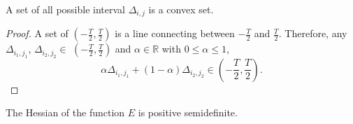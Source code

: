 \begin{prop}
A set of all possible interval $\Delta_{i,j}$ is a convex set.
\label{prop:convexset}
\end{prop}
\begin{proof}
A set of $(-\frac{T}{2}, \frac{T}{2})$ is a line connecting between $-\frac{T}{2}$ and $\frac{T}{2}$. 
Therefore, any $\Delta_{i_1,j_1}$, $\Delta_{i_2,j_2} \in$  $(-\frac{T}{2}, \frac{T}{2})$ and $\alpha \in \mathbb{R}$ with $0 \le \alpha \le 1$,
\begin{equation}
\alpha\Delta_{i_1,j_1} + (1-\alpha)\Delta_{i_2,j_2} \in (-\frac{T}{2}, \frac{T}{2}). \nonumber
\end{equation} 
\end{proof}

\begin{prop}
The Hessian of the function $E$ is positive semidefinite.
\label{prop:Hessian}
\end{prop}

